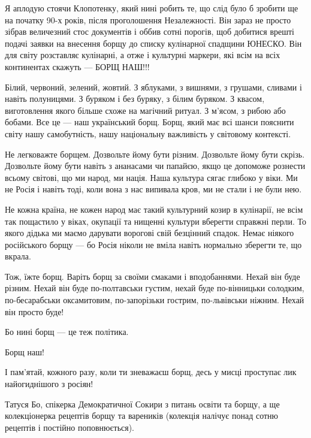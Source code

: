 Я аплодую стоячи Клопотенку, який нині робить те, що слід було б зробити ще на
початку 90-х років, після проголошення Незалежності. Він зараз не просто зібрав
величезний стос документів і оббив сотні порогів, щоб добитися врешті подачі
заявки на внесення борщу до списку кулінарної спадщини ЮНЕСКО. Він для світу
розставляє кулінарні, а отже і культурні маркери, які всім на всіх континентах
скажуть — БОРЩ НАШ!!!

Білий, червоний, зелений, жовтий. З яблуками, з вишнями, з грушами, сливами і
навіть полуницями. З буряком і без буряку, з білим буряком. З квасом,
виготовлення якого більше схоже на магічний ритуал. З м'ясом, з рибою або
бобами. Все це — наш український борщ. Борщ, який має всі шанси пояснити світу
нашу самобутність, нашу національну важливість у світовому контексті. 

Не легковажте борщем. Дозвольте йому бути різним. Дозвольте йому бути скрізь.
Дозвольте йому бути навіть з ананасами чи папайєю, якщо це допоможе рознести
всьому світові, що ми народ, ми нація.  Наша культура сягає глибоко у віки. Ми
не Росія і навіть тоді, коли вона з нас випивала кров, ми не стали і не були
нею.

Не кожна країна, не кожен народ має такий культурний козир в кулінарії, не всім
так пощастило у віках, окупації та нищенні культури вберегти справжні перли. То
якого дідька ми маємо дарувати ворогові свій безцінний спадок. Немає ніякого
російського борщу — бо Росія ніколи не вміла навіть нормально зберегти те, що
вкрала.

Тож, їжте борщ. Варіть борщ за своїми смаками і вподобаннями. Нехай він буде
різним. Нехай він буде по-полтавськи густим, нехай буде по-вінницьки солодким,
по-бесарабськи оксамитовим, по-запорізьки гострим, по-львівськи ніжним. Нехай
він просто буде! 

Бо нині борщ — це теж політика.

Борщ наш!

І пам’ятай, кожного разу, коли ти зневажаєш борщ, десь у мисці проступає лик найогиднішого з росіян!

Татуся Бо, спікерка Демократичної Сокири з питань освіти та борщу, а ще
колекціонерка рецептів борщу та вареників (колекція налічує понад сотню
рецептів і постійно поповнюється).
